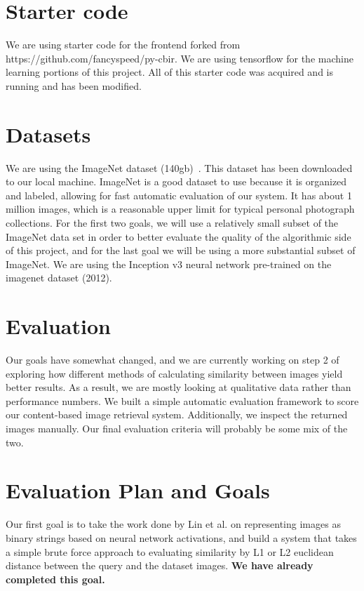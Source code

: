 \section{Starter code}
We are using starter code for the frontend forked from https://github.com/fancyspeed/py-cbir.
We are using tensorflow for the machine learning portions of this project.
All of this starter code was acquired and is running and has been modified.

\section{Datasets}
We are using the ImageNet dataset (140gb)~\cite{deng2009imagenet}. This dataset has been downloaded to our local machine.
ImageNet is a good dataset to use because it is organized and labeled, allowing for fast automatic evaluation of our system.
It has about 1 million images, which is a reasonable upper limit for typical personal photograph collections.
For the first two goals, we will use a relatively small subset of the ImageNet data set in order to better evaluate the
quality of the algorithmic side of this project, and for the last goal we will be using a more substantial subset of ImageNet.
We are using the Inception v3 neural network pre-trained on the imagenet dataset (2012).

\section{Evaluation}
Our goals have somewhat changed, and we are currently working on step 2 of exploring how different methods of
calculating similarity between images yield better results.
As a result, we are mostly looking at qualitative data rather than performance numbers.
We built a simple automatic evaluation framework to score our content-based image retrieval system.
Additionally, we inspect the returned images manually. Our final evaluation criteria will probably be some mix of the two.

\section{Evaluation Plan and Goals}

Our first goal is to take the work done by Lin et al. on representing images as binary strings based on neural network activations,
and build a system that takes a simple brute force approach to evaluating similarity by L1 or L2 euclidean distance between the query and the dataset images.
\textbf{We have already completed this goal.}

